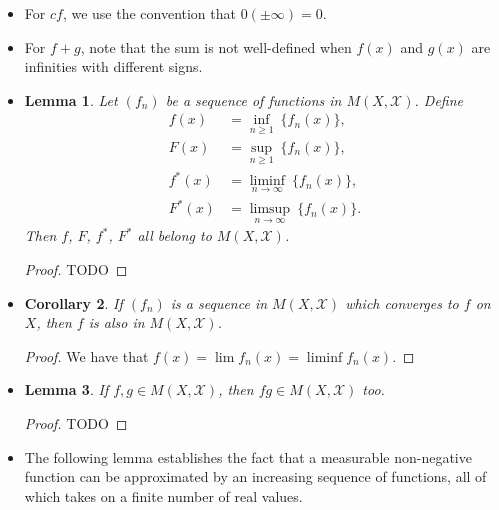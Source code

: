 \documentclass[10pt]{article}
\newtheorem{lemma}{Lemma}
\newtheorem{corollary}[lemma]{Corollary}
\newcommand{\mcal}[1]{\mathcal{#1}}
\begin{document}
\begin{itemize}
  \item For $cf$, we use the convention that $0(\pm\infty) = 0$.
  
  \item For $f+g$, note that the sum is not well-defined when $f(x)$ and $g(x)$ are infinities with different signs.
  
  \item \begin{lemma}
  Let $(f_n)$ be a sequence of functions in $M(X, \mcal{X})$. Define
  \begin{align*}
    f(x) &= \inf_{n \geq 1}\ \{ f_n(x) \}, \\
    F(x) &= \sup_{n \geq 1}\ \{ f_n(x) \}, \\
    f^*(x) &= \liminf_{n \rightarrow \infty}\ \{ f_n(x) \}, \\
    F^*(x) &= \limsup_{n \rightarrow \infty}\ \{ f_n(x) \}.
  \end{align*}
  Then $f$, $F$, $f^*$, $F^*$ all belong to $M(X, \mcal{X})$.
  \end{lemma}

  \begin{proof}
    TODO
  \end{proof}

  \item \begin{corollary}
    If $(f_n)$ is a sequence in $M(X, \mcal{X})$ which converges to $f$ on $X$, then $f$ is also in $M(X, \mcal{X})$.
  \end{corollary}

  \begin{proof}
    We have that $f(x) = \lim f_n(x) = \liminf f_n(x)$.
  \end{proof}

  \item \begin{lemma} \label{lemma:integral-is-monotone}
    If $f, g \in M(X, \mcal{X})$, then $fg \in M(X, \mcal{X})$ too.
  \end{lemma}

  \begin{proof}
    TODO
  \end{proof}

  \item The following lemma establishes the fact that a measurable non-negative function can be approximated by an increasing sequence of functions, all of which takes on a finite number of real values.
  

\end{itemize}
\end{document}

